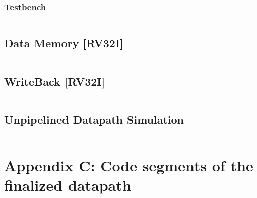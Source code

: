 \subsubsection{Testbench}
\begin{code}
\label{code:IE_TB}  
\inputminted[fontsize=\footnotesize]{vhdl}{\simfolder IE_testbench.vhd}
\end{code}
\newpage


\subsection{Data Memory [RV32I]}
\begin{code}
\label{code:DM_code}  
\inputminted[fontsize=\footnotesize]{vhdl}{\srcfolder data_memory.vhd}
\end{code}
\newpage


\subsection{WriteBack [RV32I]}
\begin{code}
\label{code:WB_code}  
\inputminted[fontsize=\footnotesize]{vhdl}{\srcfolder write_back.vhd}
\end{code}

\subsection{Unpipelined Datapath Simulation}
\begin{code}
\label{code:DP_test}  
\inputminted[fontsize=\footnotesize]{vhdl}{\simfolder WB_testbench.vhd}
\end{code}
\newpage

\section{Appendix C: Code segments of the finalized datapath}